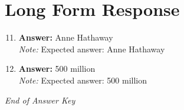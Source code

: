 \documentclass[12pt]{article}
\begin{document}
\section*{Long Form Response}
\begin{enumerate}[label=\arabic*.]
\setcounter{enumi}{10}
\item \textbf{Answer:} Anne Hathaway
\\ \textit{Note:} Expected answer: Anne Hathaway
\item \textbf{Answer:} 500 million
\\ \textit{Note:} Expected answer: 500 million
\end{enumerate}

\vfill
\noindent\textit{End of Answer Key}
\end{document}
